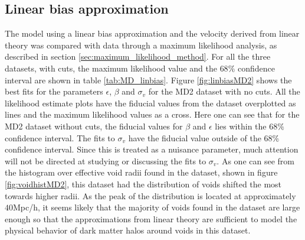 \subsection{Linear bias approximation}
The model using a linear bias approximation and the velocity derived from linear theory was compared with data through a maximum likelihood analysis, as described in section \ref{sec:maximum_likelihood_method}. For all the three datasets, with cuts, the maximum likelihood value and the $68\%$ confidence interval are shown in table \ref{tab:MD_linbias}. Figure \ref{fig:linbiasMD2} shows the best fits for the parameters $\epsilon$, $\beta$ and $\sigma_v$ for the MD2 dataset with no cuts. All the likelihood estimate plots have the fiducial values from the dataset overplotted as lines and the maximum likelihood values as a cross. Here one can see that for the MD2 dataset without cuts, the fiducial values for $\beta$ and $\epsilon$ lies within the $68\%$ confidence interval. The fits to $\sigma_v$ have the fiducial value outside of the $68\%$ confidence interval. Since this is treated as a nuisance parameter, much attention will not be directed at studying or discussing the fits to $\sigma_v$. As one can see from the histogram over effective void radii found in the dataset, shown in figure \ref{fig:voidhistMD2}, this dataset had the distribution of voids shifted the most towards higher radii. As the peak of the distribution is located at approximately $40$Mpc/h, it seems likely that the majority of voids found in the dataset are large enough so that the approximations from linear theory are sufficient to model the physical behavior of dark matter halos around voids in this dataset.\\\indent
